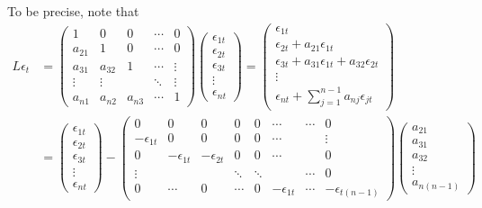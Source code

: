 \documentclass{article}
\begin{document}
To be precise, note that 
\begin{align*}
L\epsilon _{t}& =%
\begin{pmatrix}
1 & 0 & 0 & \cdots & 0 \\ 
a_{21} & 1 & 0 & \cdots & 0 \\ 
a_{31} & a_{32} & 1 & \cdots & \vdots \\ 
\vdots & \vdots &  & \ddots & \vdots \\ 
a_{n1} & a_{n2} & a_{n3} & \cdots & 1%
\end{pmatrix}%
\begin{pmatrix}
\epsilon _{1t} \\ 
\epsilon _{2t} \\ 
\epsilon _{3t} \\ 
\vdots \\ 
\epsilon _{nt}%
\end{pmatrix}%
=%
\begin{pmatrix}
\epsilon _{1t} \\ 
\epsilon _{2t}+a_{21}\epsilon _{1t} \\ 
\epsilon _{3t}+a_{31}\epsilon _{1t}+a_{32}\epsilon _{2t} \\ 
\vdots \\ 
\epsilon _{nt}+\sum_{j=1}^{n-1}a_{nj}\epsilon _{jt}%
\end{pmatrix}
\\
& =%
\begin{pmatrix}
\epsilon _{1t} \\ 
\epsilon _{2t} \\ 
\epsilon _{3t} \\ 
\vdots \\ 
\epsilon _{nt}%
\end{pmatrix}%
-%
\begin{pmatrix}
0 & 0 & 0 & 0 & 0 & \cdots & \cdots & 0 \\ 
-\epsilon _{1t} & 0 & 0 & 0 & 0 & \cdots &  & \vdots \\ 
0 & -\epsilon _{1t} & -\epsilon _{2t} & 0 & 0 & \cdots &  & 0 \\ 
\vdots &  &  & \ddots & \ddots &  & \cdots & 0 \\ 
0 & \cdots & 0 & \cdots & 0 & -\epsilon _{1t} & \cdots & -\epsilon _{t(n-1)}%
\end{pmatrix}%
\begin{pmatrix}
a_{21} \\ 
a_{31} \\ 
a_{32} \\ 
\vdots \\ 
a_{n(n-1)}%
\end{pmatrix}%
\end{align*}%
\end{document}

